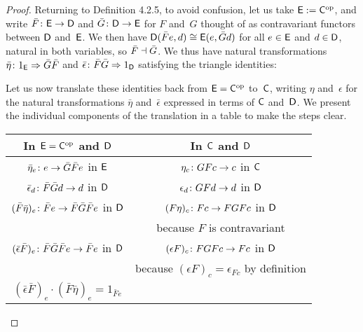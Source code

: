 \documentclass[../../solutions]{subfiles}
\begin{document}
\begin{proof}
  Returning to Definition 4.2.5, to avoid confusion, let us take
  ${\mathsf{E}}:={\mathsf{C}}^{\mathrm{op}}$, and write ${\bar F}\colon{{\mathsf{E}}}\to{{\mathsf{D}}}$ and
  ${\bar G}\colon{{\mathsf{D}}}\to{{\mathsf{E}}}$ for $F$ and~$G$ thought of as
  contravariant functors between ${\mathsf{D}}$ and~${\mathsf{E}}$.  We then have
  ${\mathsf{D}}(\bar Fe,d)\cong {\mathsf{E}}(e,\bar Gd)$ for all $e\in{\mathsf{E}}$ and
  $d\in{\mathsf{D}}$, natural in both variables, so $\bar F\dashv \bar G$.  We
  thus have natural transformations
  ${\bar\eta}\colon{1_{\mathsf{E}}}\Rightarrow{\bar G \bar F}$ and
  ${\bar\epsilon}\colon{\bar F \bar G}\Rightarrow{1_{\mathsf{D}}}$ satisfying the triangle
  identities:
  \begin{center}
  \end{center}
  Let us now translate these identities back from ${\mathsf{E}}={\mathsf{C}}^{\mathrm{op}}$
  to~${\mathsf{C}}$, writing $\eta$ and~$\epsilon$ for the natural
  transformations $\bar\eta$ and~$\bar\epsilon$ expressed in terms of
  ${\mathsf{C}}$ and~${\mathsf{D}}$.  We present the individual components of the
  translation in a table to make the steps clear.
  \begin{center}
    \renewcommand{\arraystretch}{1.4}
    \begin{tabular}{c|c}
      In ${\mathsf{E}}={\mathsf{C}}^{\mathrm{op}}$ and ${\mathsf{D}}$
          & In ${\mathsf{C}}$ and ${\mathsf{D}}$ \\ \hline
      ${\bar\eta_e}\colon{e}\to{\bar G\bar F e}$ in ${\mathsf{E}}$
          & ${\eta_c}\colon{GFc}\to{c}$ in ${\mathsf{C}}$ \\
      ${\bar\epsilon_d}\colon{\bar F\bar G d}\to{d}$ in ${\mathsf{D}}$
          & ${\epsilon_d}\colon{GFd}\to{d}$ in ${\mathsf{D}}$ \\
      ${(\bar F\bar\eta)_e}\colon{\bar F e}\to{\bar F \bar G \bar F e}$ in
      ${\mathsf{D}}$
          & ${(F\eta)_c}\colon{Fc}\to{FGFc}$ in ${\mathsf{D}}$ \\[-5pt]
          & because $F$ is contravariant \\
      ${(\bar\epsilon\bar F)_e}\colon{\bar F \bar G \bar F e}\to{\bar F
      e}$ in ${\mathsf{D}}$
          & ${(\epsilon F)_c}\colon{FGFc}\to{Fc}$ in ${\mathsf{D}}$ \\[-5pt]
          & because $(\epsilon F)_c=\epsilon_{Fc}$ by definition \\
      $(\bar\epsilon \bar F)_e\cdot (\bar F\bar\eta)_e = 1_{\bar F e}$

\end{tabular}
\end{center}
\end{proof}
\end{document}
